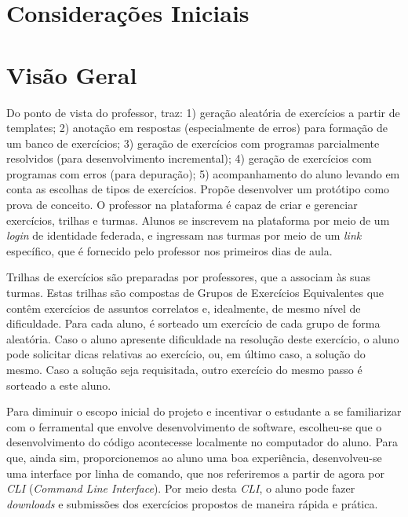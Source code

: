\section{Considerações Iniciais}

\section{Visão Geral}


Do ponto de vista do professor, traz: 1) geração aleatória de exercícios a partir de templates; 2) anotação em respostas (especialmente de erros) para formação de um banco de exercícios; 3) geração de exercícios com programas parcialmente resolvidos (para desenvolvimento incremental); 4) geração de exercícios com programas com erros (para depuração); 5) acompanhamento do aluno levando em conta as escolhas de tipos de exercícios. Propõe desenvolver um protótipo como prova de conceito.
O professor na plataforma é capaz de criar e gerenciar exercícios, trilhas e turmas. 
Alunos se inscrevem na plataforma por meio de um \emph{login} de identidade federada, e 
ingressam nas turmas por meio de um \emph{link} específico, que é fornecido 
pelo professor nos primeiros dias de aula. 

Trilhas de exercícios são preparadas por professores, que a associam às suas turmas. 
Estas trilhas são compostas de Grupos de Exercícios Equivalentes que 
contêm exercícios de assuntos correlatos e, idealmente, de mesmo nível de dificuldade.
Para cada aluno, é sorteado um exercício de cada grupo de forma aleatória. 
Caso o aluno apresente dificuldade na resolução deste exercício, o aluno pode solicitar 
dicas relativas ao exercício, ou, em último caso, a solução do mesmo. Caso a solução 
seja requisitada, outro exercício do mesmo passo é sorteado a este aluno.

Para diminuir o escopo inicial do projeto e incentivar o estudante a se familiarizar com o ferramental 
que envolve desenvolvimento de software, escolheu-se que o desenvolvimento do código 
acontecesse localmente no computador do aluno. Para que, ainda sim, proporcionemos ao aluno 
uma boa experiência, desenvolveu-se uma interface por linha de comando, que nos referiremos a partir de agora 
por \emph{CLI} (\emph{Command Line Interface}). Por meio desta \emph{CLI},
o aluno pode fazer \emph{downloads} e submissões
dos exercícios propostos de maneira rápida e prática.

